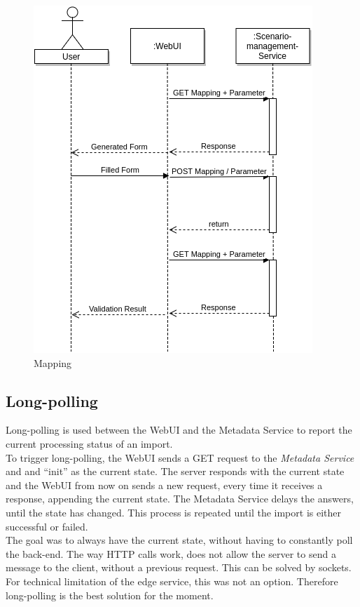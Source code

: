 \begin{figure}[H]
	\centering\includegraphics[width=.65\textwidth]{res/Mapping}
	\caption{Mapping}
	\label{fig:mapping}
\end{figure}


\subsection{Long-polling}
\label{sec:long-polling}
Long-polling is used between the WebUI and the Metadata Service to report the current processing status of an import.\\
To trigger long-polling, the WebUI sends a GET request to the \textit{Metadata Service} and and \enquote{init} as the current state. The server responds with the current state and the WebUI from now on sends a new request, every time it receives a response, appending the current state. The Metadata Service delays the answers, until the state has changed. This process is repeated until the import is either successful or failed.\\
The goal was to always have the current state, without having to constantly poll the back-end. The way HTTP calls work, does not allow the server to send a message to the client, without a previous request. This can be solved by sockets. For technical limitation of the edge service, this was not an option. Therefore long-polling is the best solution for the moment.

